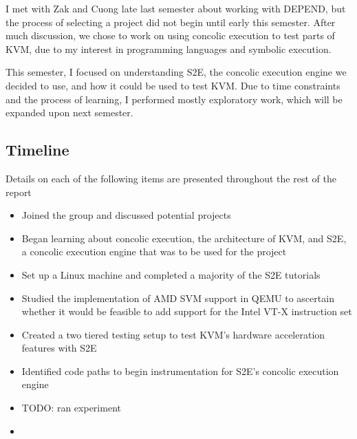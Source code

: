 I met with Zak and Cuong late last semester about working with DEPEND, but the
process of selecting a project did not begin until early this semester. After
much discussion, we chose to work on using concolic execution to test parts of
KVM, due to my interest in programming languages and symbolic execution. \par
This
semester, I focused on understanding S2E, the concolic execution engine we
decided to use, and how it could be used to test KVM. Due to time constraints
and the process of learning, I performed mostly exploratory work, which will be
expanded upon next semester.

\subsection{Timeline}
Details on each of the following items are presented throughout the rest of the
report
\begin{itemize}
\item Joined the group and discussed potential projects
\item Began learning about concolic execution, the architecture of KVM, and S2E,
  a concolic execution engine that was to be used for the project
\item Set up a Linux machine and completed a majority of the S2E tutorials
\item Studied the implementation of AMD SVM support in QEMU to ascertain whether
  it would be feasible to add support for the Intel VT-X instruction set
\item Created a two tiered testing setup to test KVM's hardware acceleration
  features with S2E
\item Identified code paths to begin instrumentation for S2E's concolic
  execution engine
\item TODO: ran experiment
\item 
\end{itemize}

